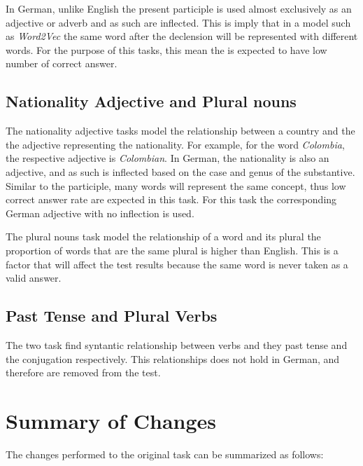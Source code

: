 In German, unlike English  the present participle is used almost exclusively as an
adjective or adverb and as such are inflected. This is imply that in a model
such as  \textit{Word2Vec} the same word after the declension will be
represented with different words. For the purpose of this tasks, this mean
the is expected to have low number of correct answer.

\subsection{Nationality Adjective and  Plural nouns}
\label{sec:sub_sec_nat_plu}

The nationality adjective tasks model the relationship between a country and
the the adjective representing the nationality. For example, for the word
\textit{Colombia}, the respective adjective is \textit{Colombian}. In German,
the nationality is also an adjective, and as such is inflected based on the
case and genus of the substantive. Similar to the participle, many words will
represent the same concept, thus low correct answer rate are expected in this
task.  For this task the corresponding German adjective with no inflection is  used.

The plural nouns task model the relationship of a word and its plural the
proportion of words that are the same plural is higher than English. This is
a factor that will affect the test results because the same word is never taken as a
valid answer. 


\subsection{Past Tense and Plural Verbs}
\label{sec:sub_sec_plural_verbs}
The two task find syntantic relationship between verbs and they past tense
and the conjugation respectively. This relationships does not hold in German,
and therefore are removed from the test.

\section{Summary of Changes} 
The changes performed to the original task can be summarized as follows:


